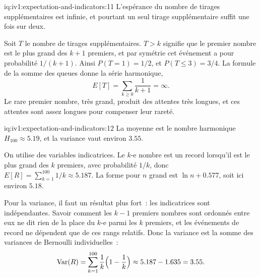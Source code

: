 \begin{solution}{iq:iv1:expectation-and-indicators:11}
L'espérance du nombre de tirages supplémentaires est infinie, et pourtant un seul tirage supplémentaire suffit une fois sur deux.

Soit $T$ le nombre de tirages supplémentaires. $T > k$ signifie que le premier nombre est le plus grand des $k+1$ premiers, et par symétrie
cet événement a pour probabilité $1/(k+1)$. Ainsi $P(T = 1) = 1/2$, et $P(T \le 3) = 3/4$. La formule de la somme des queues
donne la série harmonique,
\[
E[T] = \sum_{k \ge 0} \frac{1}{k+1} = \infty.
\]
Le rare premier nombre, très grand, produit des attentes très longues, et ces attentes sont assez longues pour compenser leur rareté.

\end{solution}

\begin{solution}{iq:iv1:expectation-and-indicators:12}
La moyenne est le nombre harmonique $H_{100} \approx 5.19$, et la variance vaut environ $3.55$.

On utilise des variables indicatrices. Le $k$-e nombre est un record lorsqu'il est le plus grand des $k$ premiers, avec probabilité $1/k$, donc
$E[R] = \sum_{k=1}^{100} 1/k \approx 5.187$. La forme pour $n$ grand est $\ln n + 0.577$, soit ici environ $5.18$.

Pour la variance, il faut un résultat plus fort~: les indicatrices sont indépendantes. Savoir comment les $k-1$ premiers nombres sont ordonnés entre
eux ne dit rien de la place du $k$-e parmi les $k$ premiers, et les événements de record ne dépendent que de ces rangs relatifs. Donc la
variance est la somme des variances de Bernoulli individuelles~:
\[
\mathrm{Var}(R) = \sum_{k=1}^{100} \frac1k\Bigl(1 - \frac1k\Bigr) \approx 5.187 - 1.635 = 3.55.
\]
\end{solution}


